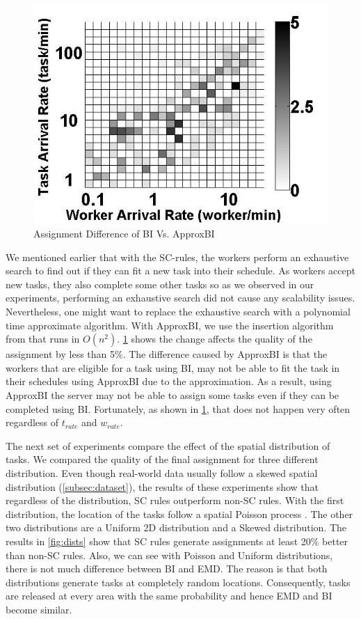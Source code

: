 \begin{figure}[h]
	\centering
	\includegraphics[scale=0.25]{figures/bi_abi.jpg}
	\vspace{-0.1in}
	\caption{Assignment Difference of BI Vs. ApproxBI}\label{fig:bi_abi}
\end{figure}

We mentioned earlier that with the SC-rules, the workers perform an exhaustive search to find out if they can fit a new task into their schedule. As workers accept new tasks, they also complete some other tasks so as we observed in our experiments, performing an exhaustive search did not cause any scalability issues. Nevertheless, one might want to replace the exhaustive search with a polynomial time approximate algorithm. With ApproxBI, we use the insertion algorithm from \cite{Rosenkrantz74} that runs in $O(n^2)$. \cref{fig:bi_abi} shows the change affects the quality of the assignment by less than 5\%. The difference caused by ApproxBI is that the workers that are eligible for a task using BI, may not be able to fit the task in their schedules using ApproxBI due to the approximation. As a result, using ApproxBI the server may not be able to assign some tasks even if they can be completed using BI. Fortunately, as shown in \cref{fig:bi_abi}, that does not happen very often regardless of $t_{rate}$ and $w_{rate}$.

The next set of experiments compare the effect of the spatial distribution of tasks. We compared the quality of the final assignment for three different distribution. Even though real-world data usually follow a skewed spatial distribution (\cref{subsec:dataset}), the results of these experiments show that regardless of the distribution, SC rules outperform non-SC rules. With the first distribution, the location of the tasks follow a spatial Poisson process \cite{Baddeley07}. The other two distributions are a Uniform 2D distribution and a Skewed distribution. The results in \cref{fig:dists} show that SC rules generate assignments at least 20\% better than non-SC rules. Also, we can see with Poisson and Uniform distributions, there is not much difference between BI and EMD. The reason is that both distributions generate tasks at completely random locations. Consequently, tasks are released at every area with the same probability and hence EMD and BI become similar.

